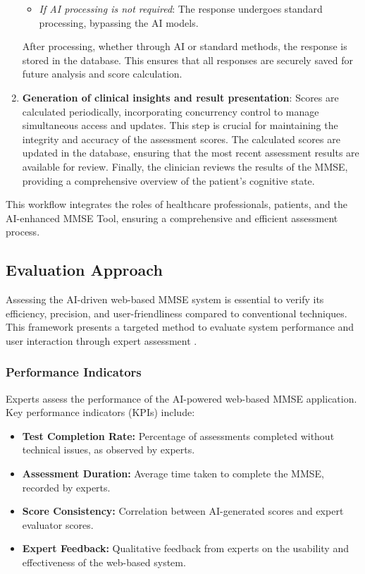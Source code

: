 \begin{enumerate}
\begin{itemize}
        \item \textit{If AI processing is not required}: The response undergoes standard processing, bypassing the AI models.
    \end{itemize}
    After processing, whether through AI or standard methods, the response is stored in the database. This ensures that all responses are securely saved for future analysis and score calculation.
    \item \textbf{Generation of clinical insights and result presentation}: Scores are calculated periodically, incorporating concurrency control to manage simultaneous access and updates. This step is crucial for maintaining the integrity and accuracy of the assessment scores. The calculated scores are updated in the database, ensuring that the most recent assessment results are available for review. Finally, the clinician reviews the results of the MMSE, providing a comprehensive overview of the patient’s cognitive state.
\end{enumerate}

This workflow integrates the roles of healthcare professionals, patients, and the AI-enhanced MMSE Tool, ensuring a comprehensive and efficient assessment process.

\subsection{Evaluation Approach}
Assessing the AI-driven web-based MMSE system is essential to verify its efficiency, precision, and user-friendliness compared to conventional techniques. This framework presents a targeted method to evaluate system performance and user interaction through expert assessment \cite{Greenhalgh2017}.

\subsubsection{Performance Indicators}
Experts assess the performance of the AI-powered web-based MMSE application. Key performance indicators (KPIs) include:
\begin{itemize}
\item \textbf{Test Completion Rate:} Percentage of assessments completed without technical issues, as observed by experts.
\item \textbf{Assessment Duration:} Average time taken to complete the MMSE, recorded by experts.
\item \textbf{Score Consistency:} Correlation between AI-generated scores and expert evaluator scores.
\item \textbf{Expert Feedback:} Qualitative feedback from experts on the usability and effectiveness of the web-based system.
\end{itemize}

